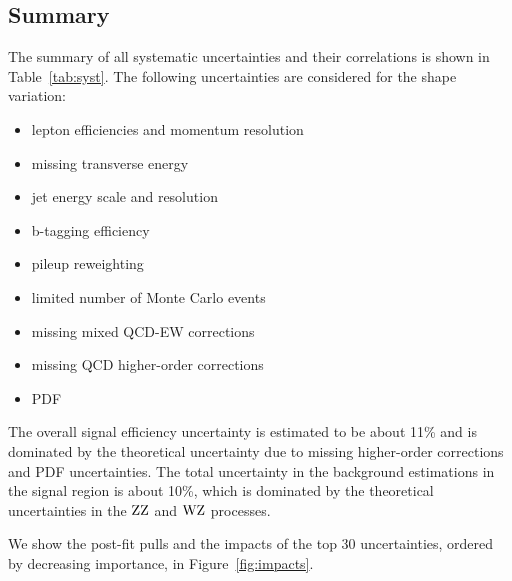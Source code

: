 \subsection{Summary}
\label{sec:syst_summary}

The summary of all systematic uncertainties and their correlations is shown in Table~\ref{tab:syst}.
The following uncertainties are considered for the shape variation:
\begin{itemize}
\item lepton efficiencies and momentum resolution 
\item missing transverse energy 
\item jet energy scale and resolution 
\item b-tagging efficiency 
\item pileup reweighting 
\item limited number of Monte Carlo events
\item missing mixed QCD-EW corrections
\item missing QCD higher-order corrections
\item PDF
\end{itemize}

The overall signal efficiency uncertainty is estimated to be about 11\%
and is dominated by the theoretical uncertainty due to missing
higher-order corrections and PDF uncertainties. The total uncertainty in the 
background estimations in the signal region is about 10\%, which is 
dominated by the theoretical uncertainties in the $\mathrm{Z}\mathrm{Z}$ and $\mathrm{W}\mathrm{Z}$ processes.

We show the post-fit pulls and the impacts of the top 30 uncertainties, ordered by decreasing importance,
in Figure~\ref{fig:impacts}.

